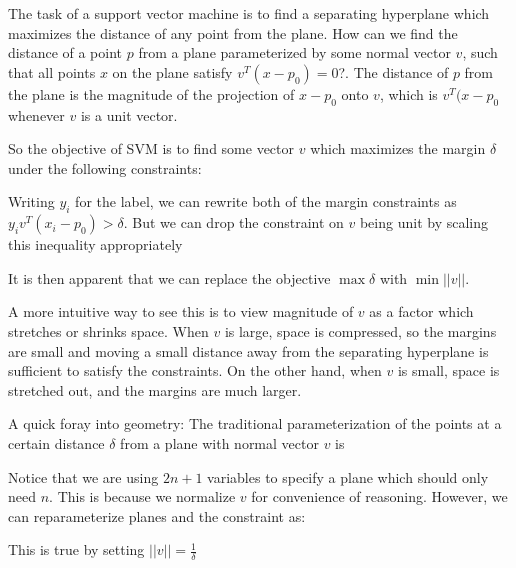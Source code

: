 \documentclass[12pt]{article}
\begin{document}
The task of a support vector machine is to find a separating hyperplane which maximizes the distance of any point from the plane. How can we find the distance of a point $p$ from a plane parameterized by some normal vector $v$, such that all points $x$ on the plane satisfy $v^T(x-p_0) = 0$?. The distance of $p$ from the plane is the magnitude of the projection of $x-p_0$ onto $v$, which is $v^T(x-p_0$ whenever $v$ is a unit vector.

So the objective of SVM is to find some vector $v$ which maximizes the margin $\delta$ under the following constraints:


Writing $y_i$ for the label, we can rewrite both of the margin constraints as $y_i v^T(x_i -p_0) > \delta$. But we can drop the constraint on $v$ being unit by scaling this inequality appropriately


It is then apparent that we can replace the objective $\max \delta$ with $\min ||v||$.

A more intuitive way to see this is to view magnitude of $v$ as a factor which stretches or shrinks space. When $v$ is large, space is compressed, so the margins are small and moving a small distance away from the separating hyperplane is sufficient to satisfy the constraints. On the other hand, when $v$ is small, space is stretched out, and the margins are much larger.

A quick foray into geometry:
The traditional parameterization of the points at a certain distance $\delta$ from a plane with normal vector $v$ is

Notice that we are using $2n+1$ variables to specify a plane which should only need $n$. This is because we normalize $v$ for convenience of reasoning. However, we can reparameterize planes and the constraint as:

This is true by setting $||v|| = \frac{1}{\delta}$

\iffalse
This can be derived by using the magnitude of $v$ to indicate the offset of the plane. By setting

\eq{
  ||v|| &= \frac{1-v^Tp_0}{\delta} \\
  \delta &= \frac{1-v^Tp_0}{||v||}
  \intertext{We can plug this back into the original expression to get}
  \frac{1}{||v||}v^T(x-p_0) &= \frac{1-v^Tp_0}{||v||}\\
  v^Tx - v^Tp_0 &= 1-v^Tp_0 \\
  v^Tx &= 1
}
\fi
\end{document}
